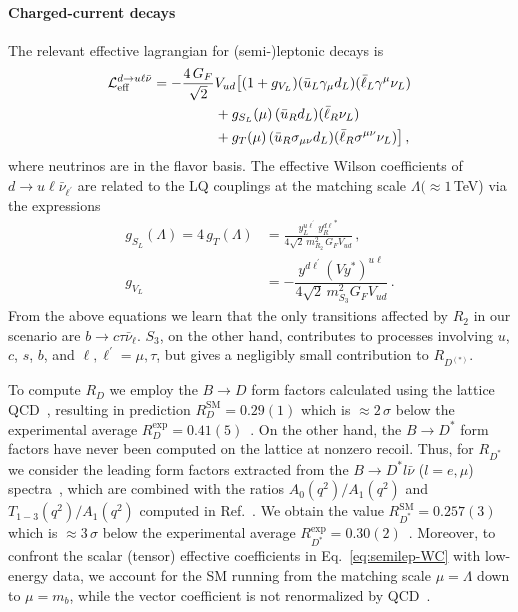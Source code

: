 \documentclass[aps,prd,superscriptaddress,twocolumn,secnumarabic]{revtex4-1}
\begin{document}
\paragraph*{Charged-current decays}
The relevant effective lagrangian for (semi-)leptonic decays is
%
\begin{equation}
\begin{split}
{\cal L}^{d \to u \ell \bar \nu}_{\mathrm{eff}} = -\frac{4 \, G_F}{\sqrt{2}} &V_{ud}\big[  (1+g_{V_L}) 
(\bar{u}_L \gamma_\mu d_L)(\bar{\ell}_L \gamma^\mu \nu_{L})\\ 
&+ g_{S_L}(\mu)\, (\bar{u}_R  d_L)(\bar{\ell}_R \nu_{L}) \\
&+ g_T(\mu)\, (\bar{u}_R  \sigma_{\mu \nu} d_L) (\bar{\ell}_{R} \sigma^{\mu \nu}\nu_L)
\big]\,,
\label{eq:hamiltonian-semilep}
\end{split}
\end{equation}
%
where neutrinos are in the flavor basis. The effective Wilson coefficients of $d\to u \ell \bar{\nu}_{\ell^\prime}$ are related to the LQ couplings at the matching scale $\Lambda (\approx 1$\,TeV) via the expressions
%
\begin{equation}
\label{eq:semilep-WC}
\begin{split}
g_{S_L}(\Lambda) = 4 \, g_T(\Lambda) &= \frac{y_L^{u\ell^\prime}\, {y_R^{d\ell}}^{\ast}}{4 \sqrt{2} \, m_{R_2}^2 \, G_F V_{ud}}\,,\\
g_{V_L}  &= -\dfrac{y^{d\ell^\prime} \left(V y^\ast\right)^{u\ell}}{4\sqrt{2} \, m_{S_3}^2 G_F V_{ud}}\,.
\end{split}  
\end{equation}
From the above equations we learn that the only transitions affected by $R_2$ in our scenario are $b\to c\tau \bar{\nu}_\ell$. $S_3$, on the other hand, contributes to processes involving $u$, $c$, $s$, $b$, and $\ell,\ell^\prime=\mu,\tau$, but gives a negligibly small contribution to $R_{D^{(\ast)}}$. 

To compute $R_D$ we employ the $B\to D$ form factors calculated using the lattice QCD~\cite{Na:2015kha,Lattice:2015rga}, resulting in prediction $R_D^{\mathrm{SM}}=0.29(1)$ which is $\approx 2\,\sigma$ below the experimental average $R_D^{\mathrm{exp}}=0.41(5)$~\cite{Lees:2012xj,Huschle:2015rga,Aaij:2017deq}. On the other hand, the $B\to D^\ast$ form factors have never been computed on the lattice at nonzero recoil. Thus, for $R_{D^\ast}$ we consider the leading form factors extracted from the $B\to D^\ast l \bar{\nu}$ ($l=e,\mu$) spectra~\cite{Amhis:2016xyh}, which are combined with the ratios $A_0(q^2)/A_1(q^2)$ and $T_{1-3}(q^2)/A_1(q^2)$ computed in Ref.~\cite{Bernlochner:2017jka}. We obtain the value $R_{D^\ast}^{\mathrm{SM}}=0.257(3)$ which is $\approx 3\,\sigma$ below the experimental average $R_{D^\ast}^{\mathrm{exp}}=0.30(2)$~\cite{Amhis:2016xyh}. Moreover, to confront the scalar (tensor) effective coefficients in Eq.~\eqref{eq:semilep-WC} with low-energy data, we account for the SM running from the matching scale $\mu = \Lambda$ down to $\mu=m_b$, while the vector coefficient is not renormalized by QCD~\cite{Gonzalez-Alonso:2017iyc}.
\end{document}
